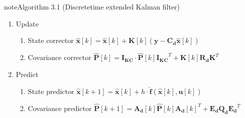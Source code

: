 \begin{sphinxadmonition}{note}{Algorithm 3.1 (Discrete\sphinxhyphen{}time extended Kalman filter)}
\begin{enumerate}
\begin{enumerate}
\begin{enumerate}
\end{enumerate}

\item {} 

Update
\begin{enumerate}
%
\item {} 

State corrector
\(\mathbf{\hat{x}}[k] = \mathbf{\hat{x}}[k] + \mathbf{K}[k] (\mathbf{y} - \mathbf{C_d} \mathbf{\hat{x}}[k]) \)

\item {} 

Covariance corrector
\(\mathbf{\hat{P}}[k] = \mathbf{I_{KC}} \cdot \mathbf{\hat{P}}[k] \mathbf{I_{KC}}^T + \mathbf{K}[k] \mathbf{R_d} \mathbf{K}^T \)

\end{enumerate}

\item {} 

Predict
\begin{enumerate}
%
\item {} 

State predictor
\(\mathbf{\hat{x}}[k+1] = \mathbf{\hat{x}}[k] + h \cdot \mathbf{\hat{f}}(\mathbf{\hat{x}}[k], \mathbf{u}[k])\)

\item {} 

Covariance predictor
\(\mathbf{\hat{P}}[k+1] = \mathbf{A_d}[k]  \mathbf{\hat{P}}[k] \mathbf{A_d}[k]^T + \mathbf{E_d} \mathbf{Q_d} \mathbf{E_d}^T \)

\end{enumerate}

\end{enumerate}

\end{enumerate}
\end{sphinxadmonition}